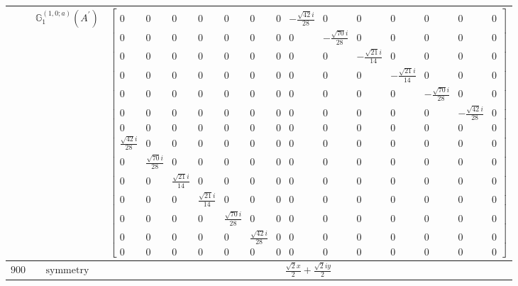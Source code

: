 \documentclass[fleqn,8pt,landscape]{jsarticle}
\begin{document}
\begin{longtable}{ccc}
$  $ & $ \mathbb{G}_{1}^{(1,0;a)}(A^{\prime}) $ & $ \begin{bmatrix} 0 & 0 & 0 & 0 & 0 & 0 & 0 & - \frac{\sqrt{42} i}{28} & 0 & 0 & 0 & 0 & 0 & 0 \\ 0 & 0 & 0 & 0 & 0 & 0 & 0 & 0 & - \frac{\sqrt{70} i}{28} & 0 & 0 & 0 & 0 & 0 \\ 0 & 0 & 0 & 0 & 0 & 0 & 0 & 0 & 0 & - \frac{\sqrt{21} i}{14} & 0 & 0 & 0 & 0 \\ 0 & 0 & 0 & 0 & 0 & 0 & 0 & 0 & 0 & 0 & - \frac{\sqrt{21} i}{14} & 0 & 0 & 0 \\ 0 & 0 & 0 & 0 & 0 & 0 & 0 & 0 & 0 & 0 & 0 & - \frac{\sqrt{70} i}{28} & 0 & 0 \\ 0 & 0 & 0 & 0 & 0 & 0 & 0 & 0 & 0 & 0 & 0 & 0 & - \frac{\sqrt{42} i}{28} & 0 \\ 0 & 0 & 0 & 0 & 0 & 0 & 0 & 0 & 0 & 0 & 0 & 0 & 0 & 0 \\ \frac{\sqrt{42} i}{28} & 0 & 0 & 0 & 0 & 0 & 0 & 0 & 0 & 0 & 0 & 0 & 0 & 0 \\ 0 & \frac{\sqrt{70} i}{28} & 0 & 0 & 0 & 0 & 0 & 0 & 0 & 0 & 0 & 0 & 0 & 0 \\ 0 & 0 & \frac{\sqrt{21} i}{14} & 0 & 0 & 0 & 0 & 0 & 0 & 0 & 0 & 0 & 0 & 0 \\ 0 & 0 & 0 & \frac{\sqrt{21} i}{14} & 0 & 0 & 0 & 0 & 0 & 0 & 0 & 0 & 0 & 0 \\ 0 & 0 & 0 & 0 & \frac{\sqrt{70} i}{28} & 0 & 0 & 0 & 0 & 0 & 0 & 0 & 0 & 0 \\ 0 & 0 & 0 & 0 & 0 & \frac{\sqrt{42} i}{28} & 0 & 0 & 0 & 0 & 0 & 0 & 0 & 0 \\ 0 & 0 & 0 & 0 & 0 & 0 & 0 & 0 & 0 & 0 & 0 & 0 & 0 & 0 \end{bmatrix} $ \\ \hline
$ 900 $ & $ \text{symmetry} $ & $ \frac{\sqrt{2} x}{2} + \frac{\sqrt{2} i y}{2} $ \\

\end{longtable}
\end{document}

